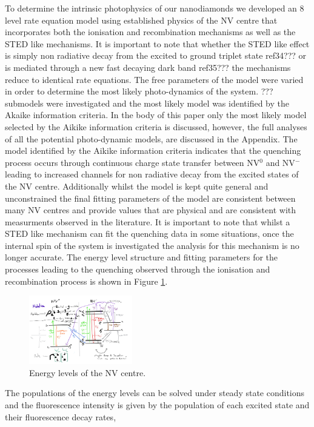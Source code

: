 \documentclass[prl]{revtex4}
\begin{document}
To determine the intrinsic photophysics of our nanodiamonds we developed an 8 level rate equation model using established physics of the NV centre that incorporates both the ionisation and recombination mechanisms as well as the STED like mechanisms. It is important to note that whether the STED like effect is simply non radiative decay from the excited to ground triplet state ref34??? or is mediated through a new fast decaying dark band ref35??? the mechanisms reduce to identical rate equations. The free parameters of the model were varied in order to determine the most likely photo-dynamics of the system. ??? submodels were investigated and the most likely model was identified by the Akaike information criteria. In the body of this paper only the most likely model selected by the Aikike information criteria is discussed, however, the full analyses of all the potential photo-dynamic models, are discussed in the Appendix. The model identified by the Aikike information criteria indicates that the quenching process occurs through continuous charge state transfer between NV$^0$ and NV$^-$ leading to increased channels for non radiative decay from the excited states of the NV centre. Additionally whilst the model is kept quite general and unconstrained the final fitting parameters of the model are consistent between many NV centres and provide values that are physical and are consistent with measurments observed in the literature. It is important to note that whilst a STED like mechanism can fit the quenching data in some situations, once the internal spin of the system is investigated the analysis for this mechanism is no longer accurate. The energy level structure and fitting parameters for the processes leading to the quenching observed through the ionisation and recombination process is shown in Figure \ref{FigEnergyLevelsNV}.

\begin{figure}[H]
  \centering
  \includegraphics[width=0.4\textwidth]{NVjpg.jpg} 
 \caption{Energy levels of the NV centre.} \label{FigEnergyLevelsNV}
\end{figure}

The populations of the energy levels can be solved under steady state conditions and the fluorescence intensity is given by the population of each excited state and their fluorescence decay rates,
\end{document}
